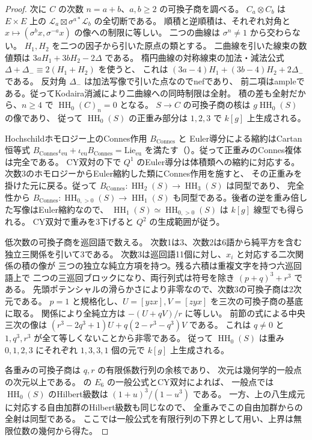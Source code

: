 \begin{proof}
次に $C$ の次数 $n=a+b$、$a,b\ge2$ の可換子商を調べる。
$C_a\otimes C_b$ は $E\times E$ 上の
$\mathcal L_a\boxtimes\sigma^{a*}\mathcal L_b$ の全切断である。
順積と逆順積は、それぞれ対角と
$x\mapsto(\sigma^b x,\sigma^{-a}x)$ の像への制限に等しい。
二つの曲線は $\sigma^n\ne1$ から交わらない。
$H_1,H_2$ を二つの因子から引いた原点の類とする。
二曲線を引いた線束の数値類は $3aH_1+3bH_2-2\Delta$ である。
楕円曲線の対称線束の加法・減法公式
$\Delta+\Delta_-\equiv2(H_1+H_2)$ を使うと、
これは $(3a-4)H_1+(3b-4)H_2+2\Delta_-$ である。
反対角 $\Delta_-$ は加法写像で引いた点なのでnefであり、
前二項はampleである。従ってKodaira消滅により二曲線への同時制限は全射。
積の差も全射だから、$n\ge4$ で $\operatorname{HH}_0(C)_n=0$ となる。
$S\to C$ の可換子商の核は $g\operatorname{HH}_0(S)$ の像であり、
従って $\operatorname{HH}_0(S)$ の正重み部分は $1,2,3$ で $k[g]$ 上生成される。

Hochschildホモロジー上のConnes作用 $B_{\mathrm{Connes}}$ と
Euler導分による縮約はCartan恒等式
$B_{\mathrm{Connes}}\iota_{\operatorname{eu}}
+\iota_{\operatorname{eu}}B_{\mathrm{Connes}}=\mathrm{Lie}_{\operatorname{eu}}$
を満たす（\cite{GoodwillieCartan}）。従って正重みのConnes複体は完全である。
CY双対の下で $Q^1$ のEuler導分は体積類への縮約に対応する。
次数3のホモロジーからEuler縮約した類にConnes作用を施すと、
その正重みを掛けた元に戻る。従って
$B_{\mathrm{Connes}}\colon\operatorname{HH}_2(S)\to\operatorname{HH}_3(S)$ は同型であり、
完全性から $B_{\mathrm{Connes}}\colon\operatorname{HH}_{0,>0}(S)\to\operatorname{HH}_1(S)$
も同型である。後者の逆を重み倍した写像はEuler縮約なので、
$\operatorname{HH}_1(S)\simeq\operatorname{HH}_{0,>0}(S)$ は $k[g]$ 線型でも得られる。
CY双対で重みを3下げると $Q^2$ の生成範囲が従う。

低次数の可換子商を巡回語で数える。
次数1は3、次数2は6語から純平方を含む独立三関係を引いて3である。
次数3は巡回語11個に対し、$x_i$ と対応する二次関係の積の像が
三つの独立な純立方項を持つ。残る六積は重複文字を持つ六巡回語上で
二つの三巡回ブロックになり、両行列式は符号を除き $(p+q)^3+r^3$ である。
先頭ポテンシャルの滑らかさにより非零なので、次数3の可換子商は2次元である。
$p=1$ と規格化し、$U=[yzx],V=[zyx]$ を三次の可換子商の基底に取る。
関係により全純立方は $-(U+qV)/r$ に等しい。
前節の式による中央三次の像は
$(r^3-2q^3+1)U+q(2-r^3-q^3)V$ である。
これは $q\ne0$ と $1,q^3,r^3$ が全て等しくないことから非零である。
従って $\operatorname{HH}_0(S)$ は重み $0,1,2,3$ にそれぞれ
$1,3,3,1$ 個の元で $k[g]$ 上生成される。

各重みの可換子商は $q,r$ の有限係数行列の余核であり、
次元は幾何学的一般点の次元以上である。
\cite[定理3.5.2(ii)]{EGdelpezzo}の $E_6$ の一般公式とCY双対によれば、
一般点では $\operatorname{HH}_0(S)$ のHilbert級数は
$(1+u)^3/(1-u^3)$ である。
一方、上の八生成元に対応する自由加群のHilbert級数も同じなので、
全重みでこの自由加群からの全射は同型である。
ここでは一般公式を有限行列の下界として用い、上界は無限位数の幾何から得た。
\end{proof}

